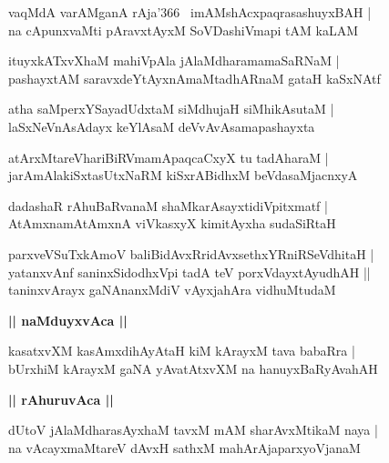 \documentclass[twoside,12pt,openright]{book}
\newcounter{shloka}[chapter]
\def\uvaca#1{\centerline{{\large\textbf{#1}}}}
\begin{document}
\begin{shloka}%
vaqMdA varAMganA rAja\char'366 ~imAMshAcxpaqrasashuyxBAH |\\
na cApunxvaMti pAravxtAyxM SoVDashiVmapi tAM kaLAM
\end{shloka}

\begin{shloka}%
ituyxkATxvXhaM mahiVpAla jAlaMdharamamaSaRNaM |\\
pashayxtAM saravxdeYtAyxnAmaMtadhARnaM gataH kaSxNAtf
\end{shloka}

\begin{shloka}%
atha saMperxYSayadUdxtaM siMdhujaH siMhikAsutaM |\\
laSxNeVnAsAdayx keYlAsaM deVvAvAsamapashayxta
\end{shloka}

\begin{shloka}%
atArxMtareVhariBiRVmamApaqcaCxyX tu tadAharaM |\\
jarAmAlakiSxtasUtxNaRM kiSxrABidhxM beVdasaMjacnxyA 
\end{shloka}

\begin{shloka}%
dadashaR rAhuBaRvanaM shaMkarAsayxtidiVpitxmatf |\\
AtAmxnamAtAmxnA viVkasxyX kimitAyxha sudaSiRtaH 
\end{shloka}

\begin{shloka}%
parxveVSuTxkAmoV baliBidAvxRridAvxsethxYRniRSeVdhitaH |\\
yatanxvAnf saninxSidodhxVpi tadA teV porxVdayxtAyudhAH ||\\
taninxvArayx gaNAnanxMdiV vAyxjahAra vidhuMtudaM 
\end{shloka}

\uvaca{|| naMduyxvAca ||}

\begin{shloka}%
kasatxvXM kasAmxdihAyAtaH kiM kArayxM tava babaRra |\\
bUrxhiM kArayxM gaNA yAvatAtxvXM na hanuyxBaRyAvahAH 
\end{shloka}

\uvaca{|| rAhuruvAca ||}

\begin{shloka}%
dUtoV jAlaMdharasAyxhaM tavxM mAM sharAvxMtikaM naya |\\
na vAcayxmaMtareV dAvxH sathxM mahArAjaparxyoVjanaM
\end{shloka}
\end{document}
